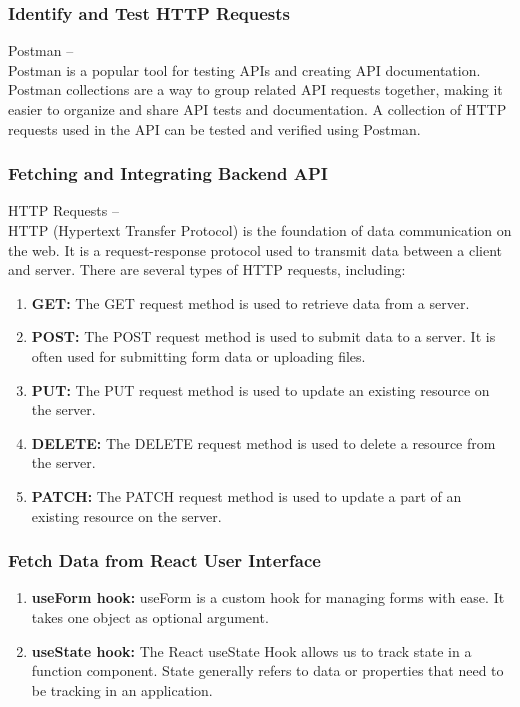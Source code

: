 \documentclass[a4paper, 12pt]{article}
\begin{document}
\subsubsection{Identify and Test HTTP Requests}
\hspace*{10mm}Postman – \\
\hspace*{10mm} Postman is a popular tool for testing APIs and creating API documentation. Postman collections are a way to group related API requests together, making it easier to organize and share API tests and documentation. A collection of HTTP requests used in the API can be tested and verified using Postman.\\

\subsubsection{Fetching and Integrating Backend API}
\hspace*{10mm}HTTP Requests – \\
\hspace{10mm} HTTP (Hypertext Transfer Protocol) is the foundation of data communication on the web. It is a request-response protocol used to transmit data between a client and server. There are several types of HTTP requests, including:
\begin{enumerate}
    \item \textbf{GET:} The GET request method is used to retrieve data from a server.
    \item \textbf{POST:} The POST request method is used to submit data to a server. It is often used for submitting form data or uploading files.
    \item \textbf{PUT:} The PUT request method is used to update an existing resource on the server.
    \item \textbf{DELETE:} The DELETE request method is used to delete a resource from the server.
     \item \textbf{PATCH:} The PATCH request method is used to update a part of an existing resource on the server.
\end{enumerate} 
\subsubsection{Fetch Data from React User Interface}
\begin{enumerate}
    \item \textbf{useForm hook:} useForm is a custom hook for managing forms with ease. It takes one object as optional argument.
    \item \textbf{useState hook:} The React useState Hook allows us to track state in a function component. State generally refers to data or properties that need to be tracking in an application.
\end{enumerate} 
\end{document}
